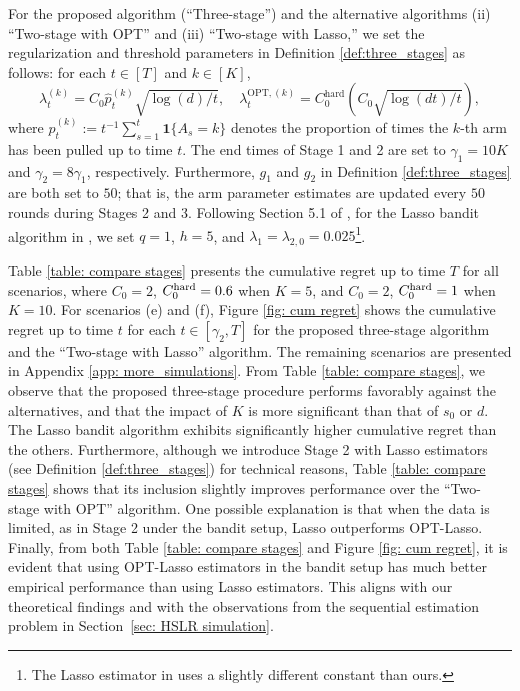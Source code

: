 \documentclass[aos,preprint]{imsart}
\theoremstyle{plain}
\theoremstyle{definition}
\begin{document}
For the proposed algorithm (``Three-stage'') and the alternative algorithms (ii) ``Two-stage with OPT'' and (iii) ``Two-stage with Lasso,'' we set the regularization and threshold parameters in Definition \ref{def:three_stages} as follows: for each $t \in [T]$ and $k \in [K]$,
\[
\lambda_t^{(k)} = C_0 \hat{p}_t^{(k)} \sqrt{{ \log(d)}/{t}}, \quad
\lambda_t^{\mathrm{OPT},(k)} = C_0^{\mathrm{hard}} \left( C_0 \sqrt{{ \log(dt)}/{t}} \right),
\]
where  $\hat{p}_t^{(k)} := t^{-1} \sum_{s=1}^t \mathbf{1}\{A_s = k\}$ denotes the proportion of times the $k$-th arm has been pulled up to time $t$.
The end times of Stage 1 and 2 are set to $\gamma_1 = 10K$ and $\gamma_2 = 8\gamma_1$, respectively. Furthermore, $g_1$ and $g_2$ in Definition \ref{def:three_stages} are both set to $50$; that is, the arm parameter estimates are updated every $50$ rounds during Stages 2 and 3. Following Section 5.1 of \cite{bastani2020online}, for the Lasso bandit algorithm in \cite{bastani2020online}, we set $q = 1$, $h = 5$, and $\lambda_1 = \lambda_{2,0} = 0.025$\footnote{The Lasso estimator in \cite{bastani2020online} uses a slightly different constant than ours.}.


Table \ref{table: compare stages} presents the cumulative regret up to time $T$ for all scenarios, where $C_0 = 2$, $C_0^{\textup{hard}} = 0.6$ when $K = 5$, and $C_0 = 2$, $C_0^{\textup{hard}} = 1$ when $K = 10$. For scenarios (e) and (f), Figure \ref{fig: cum regret} shows the cumulative regret up to time $t$ for each $t \in [\gamma_2, T]$ for the proposed three-stage algorithm and the ``Two-stage with Lasso'' algorithm. The remaining scenarios are presented in Appendix \ref{app: more_simulations}. From Table \ref{table: compare stages}, we observe that the proposed three-stage procedure performs favorably against the alternatives, and that the impact of $K$ is more significant than that of $s_0$ or $d$. The Lasso bandit algorithm exhibits significantly higher cumulative regret than the others. Furthermore, although we introduce Stage 2 with Lasso estimators (see Definition \ref{def:three_stages}) for technical reasons, Table \ref{table: compare stages} shows that its inclusion slightly improves performance over the ``Two-stage with OPT'' algorithm. One possible explanation is that when the data is limited, as in Stage 2 under the bandit setup, Lasso outperforms OPT-Lasso. Finally, from both Table \ref{table: compare stages} and Figure \ref{fig: cum regret}, it is evident that using OPT-Lasso estimators in the bandit setup has much better empirical performance than using Lasso estimators. This aligns with our theoretical findings and with the observations from the sequential estimation problem in Section~\ref{sec: HSLR simulation}.
\end{document}
